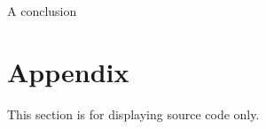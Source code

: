 \documentclass[a4paper, 10pt, conference]{ieeeconf}
\begin{document}
A conclusion \cite{infrared}




\section{Appendix}

This section is for displaying source code only.

% 
\end{document}
